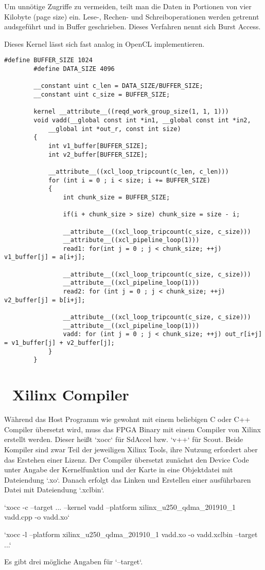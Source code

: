 		Um unnötige Zugriffe zu vermeiden, teilt man die Daten in Portionen von vier Kilobyte (page size) ein. Lese-, Rechen- und Schreiboperationen werden getrennt audsgeführt und in Buffer geschrieben. Dieses Verfahren nennt sich Burst Access.
		
		Dieses \Gls{Kernel} lässt sich fast analog in OpenCL implementieren.
		\begin{lstlisting}[caption=~FPGA: OpenCL Kernel]
		#define BUFFER_SIZE 1024
		#define DATA_SIZE 4096

		__constant uint c_len = DATA_SIZE/BUFFER_SIZE;
		__constant uint c_size = BUFFER_SIZE;

		kernel __attribute__((reqd_work_group_size(1, 1, 1)))
		void vadd(__global const int *in1, __global const int *in2, 
			__global int *out_r, const int size)
		{
			int v1_buffer[BUFFER_SIZE];
			int v2_buffer[BUFFER_SIZE];
    
			__attribute__((xcl_loop_tripcount(c_len, c_len)))
			for (int i = 0 ; i < size; i += BUFFER_SIZE) 
			{
				int chunk_size = BUFFER_SIZE;
        
				if(i + chunk_size > size) chunk_size = size - i;

				__attribute__((xcl_loop_tripcount(c_size, c_size)))
				__attribute__((xcl_pipeline_loop(1)))
				read1: for(int j = 0 ; j < chunk_size; ++j) v1_buffer[j] = a[i+j];

				__attribute__((xcl_loop_tripcount(c_size, c_size)))
				__attribute__((xcl_pipeline_loop(1)))
				read2: for (int j = 0 ; j < chunk_size; ++j) v2_buffer[j] = b[i+j];

				__attribute__((xcl_loop_tripcount(c_size, c_size)))
				__attribute__((xcl_pipeline_loop(1)))
				vadd: for (int j = 0 ; j < chunk_size; ++j) out_r[i+j] = v1_buffer[j] + v2_buffer[j];
			}
		}
		\end{lstlisting}

		\section{~Xilinx Compiler}
		Während das Host Programm wie gewohnt mit einem beliebigen C oder C++ Compiler übersetzt wird, muss das FPGA Binary mit einem Compiler von Xilinx erstellt werden. Dieser heißt \li`xocc` für SdAccel bzw. \li`v++` für Scout. Beide Kompiler sind zwar Teil der jeweiligen Xilinx Tools, ihre Nutzung erfordert aber das Erstehen einer Lizenz. Der Compiler übersetzt zunächst den Device Code unter Angabe der \Gls{Kernel}funktion und der Karte in eine Objektdatei mit Dateiendung \li`.xo`. Danach erfolgt das Linken und Erstellen einer ausführbaren Datei mit Dateiendung \li`.xclbin`.
		\begin{center}
			\li`xocc -c --target ... --kernel vadd --platform xilinx_u250_qdma_201910_1 vadd.cpp -o vadd.xo`
			
			\li`xocc -l --platform xilinx_u250_qdma_201910_1 vadd.xo -o vadd.xclbin --target ...`
		\end{center}
		Es gibt drei mögliche Angaben für \li`--target`. 
		
